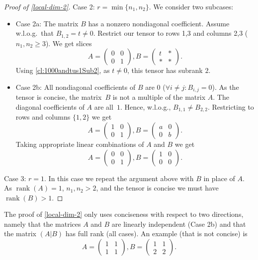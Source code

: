 \documentclass{daj}
\DeclareMathOperator{\rank}{rank} \DeclareMathOperator{\col}{colspan}
\begin{document}
\begin{proof}[Proof of \autoref{local-dim-2}]
    Case 2: $r=\min\{n_1,n_2\}$.
We consider two subcases:
    \begin{itemize}
    \item Case 2a: The matrix $B$ has a nonzero nondiagonal coefficient. Assume w.l.o.g.\ that $B_{1,2}=t \neq 0$.  
Restrict our tensor to rows 1,3 and columns 2,3 ($n_1,n_2\geq3$).
We get slices
\[
A=\begin{pmatrix}0 & 0\\ 0 & 1\end{pmatrix}, B=\begin{pmatrix}t & *\\ * & *\end{pmatrix}.
\]
Using \autoref{cl:1000andtus1Sub2}, as $t\neq 0$, this tensor has subrank $2$.

    \item Case 2b: All nondiagonal coefficients of $B$ are $0$ ($\forall i\neq j: B_{i,j}=0$). 
As the tensor is concise, the matrix~$B$ is not a multiple of the matrix $A$. The diagonal coefficients of $A$ are all~$1$. Hence, w.l.o.g., $B_{1,1}\neq B_{2,2}$.
Restricting to rows and columns $\{1,2\}$ we get 
\[
A=\begin{pmatrix}1 & 0\\ 0 & 1\end{pmatrix},
B=\begin{pmatrix}a & 0\\ 0 & b\end{pmatrix}.
\]
Taking appropriate linear combinations of $A$ and $B$ we get 
\[
A=\begin{pmatrix}0 & 0\\ 0 & 1\end{pmatrix}, B=\begin{pmatrix}1 & 0\\ 0 & 0\end{pmatrix}.
\]
\end{itemize}

    Case 3: $r=1$.
    In this case we repeat the argument above with $B$ in place of $A$. As $\rank(A)=1$, $n_1,n_2>2$, and the tensor is concise we must have $\rank(B)>1$.
\end{proof}

\begin{remark}
    The proof of \autoref{local-dim-2} only uses conciseness with respect to two directions, namely that the matrices $A$ and $B$ are linearly independent (Case 2b) and that the matrix $(A|B)$ has full rank (all cases). An example (that is not concise) is
    \[
    A=\begin{pmatrix}1 & 1\\ 1 & 1\end{pmatrix}, B=\begin{pmatrix}1 & 1\\ 2 & 2\end{pmatrix}.
    \]
\end{remark}
\end{document}
